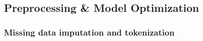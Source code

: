\documentclass{article}
\theoremstyle{plain}
\theoremstyle{definition}
\theoremstyle{remark}
\begin{document}




\subsection{Preprocessing \& Model Optimization}
\subsubsection{{Missing data imputation and tokenization}} %
\end{document}
